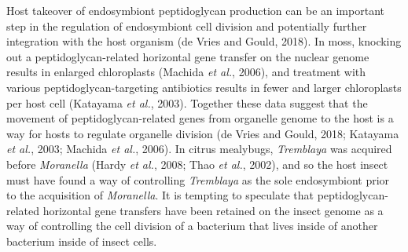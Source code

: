 \documentclass[11pt]{article}
\begin{document}
\begin{sloppypar}
\newline

Host takeover of endosymbiont peptidoglycan production can be an important step in the regulation of endosymbiont cell division and potentially further integration with the host organism (de Vries and Gould, 2018). 
In moss, knocking out a peptidoglycan-related horizontal gene transfer on the nuclear genome results in enlarged chloroplasts
(Machida \textit{et al.}, 2006), and treatment with various peptidoglycan-targeting antibiotics results in fewer and larger chloroplasts per host cell (Katayama \textit{et al.}, 2003). 
Together these data suggest that the movement of peptidoglycan-related genes from organelle genome to the host is a way for hosts to regulate organelle division (de Vries and Gould, 2018; Katayama \textit{et al.}, 2003; Machida \textit{et al.}, 2006). 
In citrus mealybugs, \textit{Tremblaya} was acquired before \textit{Moranella} (Hardy \textit{et al.}, 2008; Thao \textit{et al.}, 2002), and so the host insect must have found a way of controlling \textit{Tremblaya} as the sole endosymbiont prior to the acquisition of \textit{Moranella}. 
It is tempting to speculate that peptidoglycan-related horizontal gene transfers have been retained on the insect genome as a way of controlling the cell division of a bacterium that lives inside of another bacterium inside of insect cells.

\end{sloppypar}
\end{document}
